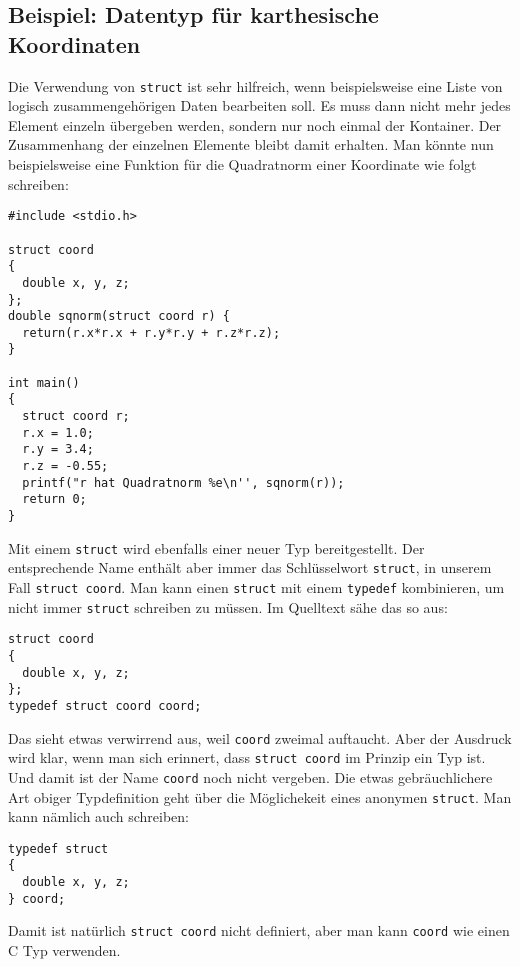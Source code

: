 \subsection{Beispiel: Datentyp für karthesische Koordinaten}

Die Verwendung von \verb|struct| ist sehr hilfreich, wenn beispielsweise eine Liste von logisch zusammengehörigen Daten bearbeiten soll.
Es muss dann nicht mehr jedes Element einzeln übergeben werden, sondern nur noch einmal der Kontainer.
Der Zusammenhang der einzelnen Elemente bleibt damit erhalten.
Man könnte nun beispielsweise eine Funktion für die Quadratnorm einer Koordinate wie folgt schreiben:
\begin{lstlisting}
#include <stdio.h>

struct coord
{
  double x, y, z;
};
double sqnorm(struct coord r) {
  return(r.x*r.x + r.y*r.y + r.z*r.z);
}

int main()
{
  struct coord r;
  r.x = 1.0;
  r.y = 3.4;
  r.z = -0.55;
  printf("r hat Quadratnorm %e\n'', sqnorm(r));
  return 0;
}
\end{lstlisting}
Mit einem \verb|struct| wird ebenfalls einer neuer Typ bereitgestellt.
Der entsprechende Name enthält aber immer das Schlüsselwort \verb|struct|, in unserem Fall \verb|struct coord|. 
Man kann einen \verb|struct| mit einem \verb|typedef| kombinieren, um nicht immer \verb|struct| schreiben zu müssen.
Im Quelltext sähe das so aus:
\begin{lstlisting}
struct coord
{
  double x, y, z;
};
typedef struct coord coord;
\end{lstlisting}
Das sieht etwas verwirrend aus, weil \verb|coord| zweimal auftaucht.
Aber der Ausdruck wird klar, wenn man sich erinnert, dass \verb|struct coord| im Prinzip ein Typ ist.
Und damit ist der Name \verb|coord| noch nicht vergeben.
Die etwas gebräuchlichere Art obiger Typdefinition geht über die Möglichekeit eines anonymen \verb|struct|.
Man kann nämlich auch schreiben:
\begin{lstlisting}
typedef struct
{
  double x, y, z;
} coord;
\end{lstlisting}
Damit ist natürlich \verb|struct coord| nicht definiert, aber man kann \verb|coord| wie einen C Typ verwenden.


\endinput

